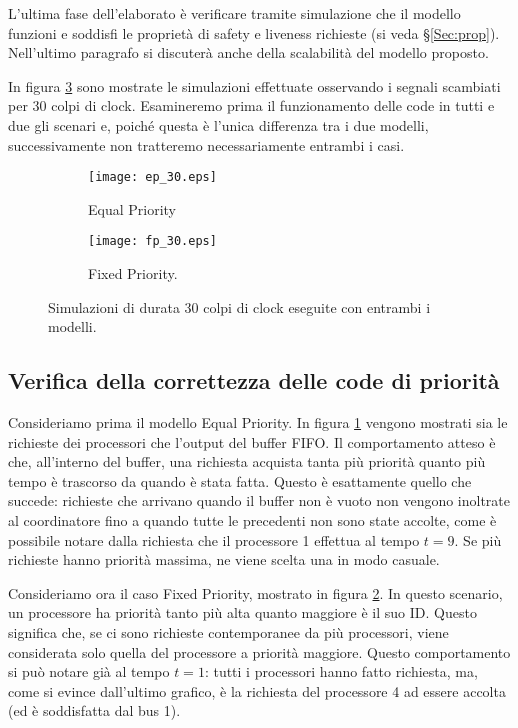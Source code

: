 L'ultima fase dell'elaborato è verificare tramite simulazione che il modello funzioni e soddisfi le proprietà di safety e liveness richieste (si veda §\ref{Sec:prop}). Nell'ultimo paragrafo si discuterà anche della scalabilità del modello proposto.

In figura \ref{Fig:sims_30} sono mostrate le simulazioni effettuate osservando i segnali scambiati per 30 colpi di clock. Esamineremo prima il funzionamento delle code in tutti e due gli scenari e, poiché questa è l'unica differenza tra i due modelli, successivamente non tratteremo necessariamente entrambi i casi.

\begin{figure}
\centering
\vspace{-2cm}
\begin{subfigure}[t]{\textwidth}
	\centering
	\texttt{[image: ep\_30.eps]}
	\vspace{-2.8cm}
	\caption{Equal Priority}
	\label{Fig:sim_ep_30}
\end{subfigure}
\begin{subfigure}[t]{\textwidth}
	\centering
	\texttt{[image: fp\_30.eps]}
	\vspace{-2.8cm}
	\caption{Fixed Priority.}
	\label{Fig:sim_fp_30}
\end{subfigure}
\caption{Simulazioni di durata 30 colpi di clock eseguite con entrambi i modelli.}
\label{Fig:sims_30}
\end{figure}


\subsection{Verifica della correttezza delle code di priorità}
Consideriamo prima il modello Equal Priority. In figura \ref{Fig:sim_ep_30} vengono mostrati sia le richieste dei processori che l'output del buffer FIFO. Il comportamento atteso è che, all'interno del buffer, una richiesta acquista tanta più priorità quanto più tempo è trascorso da quando è stata fatta. Questo è esattamente quello che succede: richieste che arrivano quando il buffer non è vuoto non vengono inoltrate al coordinatore fino a quando tutte le precedenti non sono state accolte, come è possibile notare dalla richiesta che il processore 1 effettua al tempo $t=9$. Se più richieste hanno priorità massima, ne viene scelta una in modo casuale.

Consideriamo ora il caso Fixed Priority, mostrato in figura \ref{Fig:sim_fp_30}. In questo scenario, un processore ha priorità tanto più alta quanto maggiore è il suo ID. Questo significa che, se ci sono richieste contemporanee da più processori, viene considerata solo quella del processore a priorità maggiore. Questo comportamento si può notare già al tempo $t=1$: tutti i processori hanno fatto richiesta, ma, come si evince dall'ultimo grafico, è la richiesta del processore 4 ad essere accolta (ed è soddisfatta dal bus 1).

